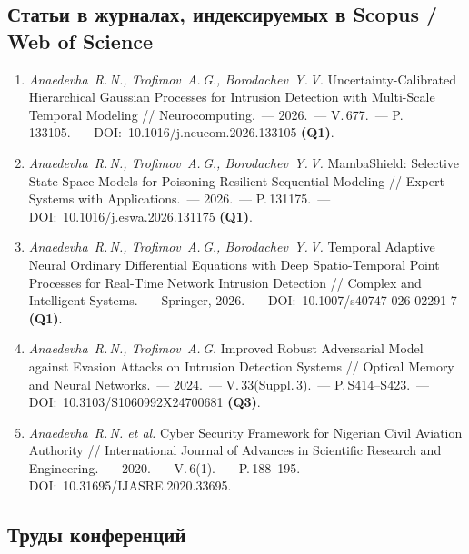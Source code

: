 \documentclass[12pt,a5paper]{article}
\begin{document}
\sloppy

\subsection*{Статьи в журналах, индексируемых в Scopus / Web of Science}

\begin{enumerate}
\item \textit{Anaedevha~R.\,N., Trofimov~A.\,G., Borodachev~Y.\,V.}
Uncertainty-Calibrated Hierarchical Gaussian Processes for
Intrusion Detection with Multi-Scale Temporal Modeling //
Neurocomputing.~--- 2026.~--- V.\,677.~--- P.\,133105.~---
DOI:~10.1016/j.neucom.2026.133105 \textbf{(Q1)}.

\item \textit{Anaedevha~R.\,N., Trofimov~A.\,G., Borodachev~Y.\,V.}
MambaShield: Selective State-Space Models for
Poisoning-Resilient Sequential Modeling // Expert Systems
with Applications.~--- 2026.~--- P.\,131175.~---
DOI:~10.1016/j.eswa.2026.131175 \textbf{(Q1)}.

\item \textit{Anaedevha~R.\,N., Trofimov~A.\,G., Borodachev~Y.\,V.}
Temporal Adaptive Neural Ordinary Differential Equations
with Deep Spatio-Temporal Point Processes for Real-Time
Network Intrusion Detection // Complex and Intelligent
Systems.~--- Springer, 2026.~---
DOI:~10.1007/s40747-026-02291-7 \textbf{(Q1)}.

\item \textit{Anaedevha~R.\,N., Trofimov~A.\,G.} Improved
Robust Adversarial Model against Evasion Attacks on
Intrusion Detection Systems // Optical Memory and Neural
Networks.~--- 2024.~--- V.\,33(Suppl.\,3).~---
P.\,S414--S423.~--- DOI:~10.3103/S1060992X24700681
\textbf{(Q3)}.

\item \textit{Anaedevha~R.\,N. et al.} Cyber Security
Framework for Nigerian Civil Aviation Authority //
International Journal of Advances in Scientific Research
and Engineering.~--- 2020.~--- V.\,6(1).~---
P.\,188--195.~--- DOI:~10.31695/IJASRE.2020.33695.
\end{enumerate}

\subsection*{Труды конференций}
\end{document}
